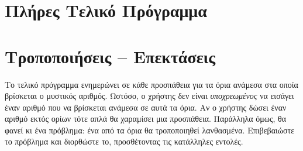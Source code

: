 \documentclass[a4paper,11pt,oneside]{book}
\begin{document}



\section{Πλήρες Τελικό Πρόγραμμα}

\tobecontinued



\section{Τροποποιήσεις -- Επεκτάσεις}

\begin{exercise}
Το τελικό πρόγραμμα ενημερώνει σε κάθε προσπάθεια για τα όρια ανάμεσα στα οποία βρίσκεται ο μυστικός αριθμός. Ωστόσο, ο χρήστης δεν είναι \emph{υποχρεωμένος} να εισάγει έναν αριθμό που να βρίσκεται ανάμεσα σε αυτά τα όρια. Αν ο χρήστης δώσει έναν αριθμό εκτός ορίων τότε απλά θα χαραμίσει μια προσπάθεια. Παράλληλα όμως, θα φανεί κι ένα πρόβλημα: ένα από τα όρια θα τροποποιηθεί λανθασμένα. Επιβεβαιώστε το πρόβλημα και διορθώστε το, προσθέτοντας τις κατάλληλες εντολές.
\end{exercise}
\end{document}
